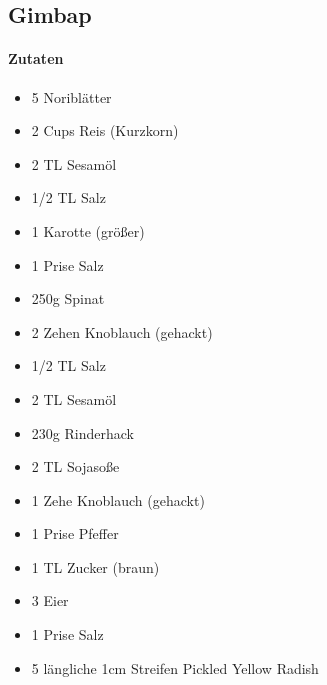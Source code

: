 \newpage
\subsection{Gimbap }
\paragraph{Zutaten}
\begin{itemize}[noitemsep]
	\item 5 Noriblätter
	\item 2 Cups Reis (Kurzkorn)
	\item 2 TL Sesamöl
	\item 1/2 TL Salz
	\item 1 Karotte (größer)
	\item 1 Prise Salz
	\item 250g Spinat
	\item 2 Zehen Knoblauch (gehackt)
	\item 1/2 TL Salz
	\item 2 TL Sesamöl
	\item 230g Rinderhack 
	\item 2 TL Sojasoße
	\item 1 Zehe Knoblauch (gehackt)
	\item 1 Prise Pfeffer 
	\item 1 TL Zucker (braun)
	\item 3 Eier
	\item 1 Prise Salz
	\item 5 längliche 1cm Streifen Pickled Yellow Radish
\end{itemize}

